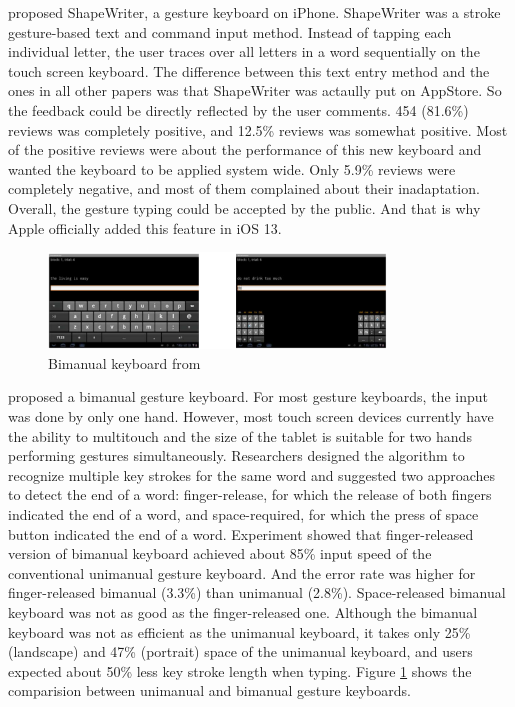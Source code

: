 \documentclass[11pt]{article}
\begin{document}
\citet{10.1145/1520340.1520380} proposed ShapeWriter, a gesture keyboard on iPhone. ShapeWriter was a stroke gesture-based text and command input method. Instead of tapping each individual letter, the user traces over all letters in a word sequentially on the touch screen keyboard. The difference between this text entry method and the ones in all other papers was that ShapeWriter was actaully put on AppStore. So the feedback could be directly reflected by the user comments. 454 (81.6\%) reviews was completely positive, and 12.5\% reviews was somewhat positive. Most of the positive reviews were about the performance of this new keyboard and wanted the keyboard to be applied system wide. Only 5.9\% reviews were completely negative, and most of them complained about their inadaptation. Overall, the gesture typing could be accepted by the public. And that is why Apple officially added this feature in iOS 13.

\begin{figure}[H]
  \centering
  \includegraphics[width=0.8\textwidth]{Bimanual.png}
  \caption{Bimanual keyboard from \citep{10.1145/2380116.2380136}}
  \label{fig:bimanual}
\end{figure}

\citet{10.1145/2380116.2380136} proposed a bimanual gesture keyboard. For most gesture keyboards, the input was done by only one hand. However, most touch screen devices currently have the ability to multitouch and the size of the tablet is suitable for two hands performing gestures simultaneously. Researchers designed the algorithm to recognize multiple key strokes for the same word and suggested two approaches to detect the end of a word: finger-release, for which the release of both fingers indicated the end of a word, and space-required, for which the press of space button indicated the end of a word. Experiment showed that finger-released version of bimanual keyboard achieved about 85\% input speed of the conventional unimanual gesture keyboard. And the error rate was higher for finger-released bimanual (3.3\%) than unimanual (2.8\%). Space-released bimanual keyboard was not as good as the finger-released one. Although the bimanual keyboard was not as efficient as the unimanual keyboard, it takes only 25\% (landscape) and 47\% (portrait) space of the unimanual keyboard, and users expected about 50\% less key stroke length when typing. Figure \ref{fig:bimanual} shows the comparision between unimanual and bimanual gesture keyboards.
\end{document}
